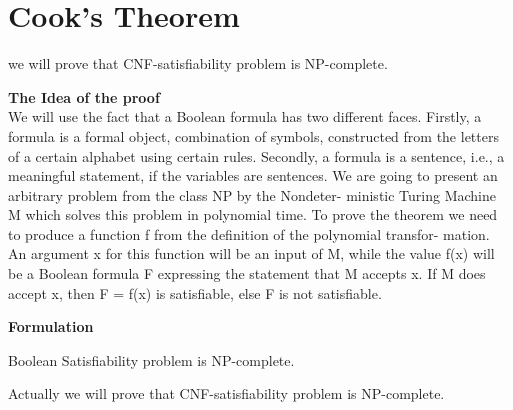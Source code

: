 \section{Cook’s Theorem}
we will prove that CNF-satisfiability problem is NP-complete.

\textbf{The Idea of the proof}\\
We will use the fact that a Boolean formula has two different faces. Firstly, a formula is a formal object, combination of symbols, constructed from the letters of a certain alphabet using certain rules. Secondly, a formula is a sentence, i.e., a meaningful statement, if the variables are sentences.
We are going to present an arbitrary problem from the class NP by the Nondeter- ministic Turing Machine M which solves this problem in polynomial time. To prove the theorem we need to produce a function f from the definition of the polynomial transfor- mation. An argument x for this function will be an input of M, while the value f(x) will be a Boolean formula F expressing the statement that M accepts x. If M does accept x, then F = f(x) is satisfiable, else F is not satisfiable.

\textbf{Formulation}\\
\begin{theorem}
    Boolean Satisfiability problem is NP-complete.
\end{theorem}
Actually we will prove that CNF-satisfiability problem is NP-complete.

